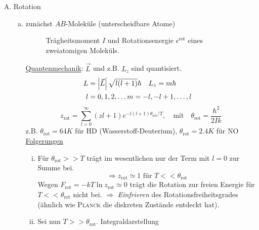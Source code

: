 \begin{enumerate}[A)]
    \item Rotation
    \begin{enumerate}[a)]
        \item zunächst $AB$-Moleküle (unterscheidbare Atome)
        
        \begin{figure}[H]
            \centering
            \def\svgwidth{0.7\textwidth}
            
            \caption{Trägheitsmoment $I$ und Rotationsenergie $\epsilon^{\text{rot}}$ eines zweiatomigen Moleküls.}
            \label{img:2atomicMoleculeInertia}
        \end{figure}
        
        \underline{Quantenmechanik}: $\vec{L}$ und z.B. $L_z$ sind quantisiert.
        \begin{equation}
            \begin{split}
                L &= \left| \vec{L} \right| \sqrt{l(l+1)} \hbar \quad L_z = m \hbar  \\
                l &= 0, 1, 2, \ldots m = -l, -l+1, \ldots, l &
            \end{split}
        \end{equation}
        \begin{equation}
            z_\text{rot} = \sum_{l=0}^{\infty} (zl + 1) e^{-l(l+1) \theta_\text{rot} / T}, \quad \text{mit} \quad \theta_\text{rot} = \frac{\hbar^2}{2 I k}
        \end{equation}
        z.B. $\theta_\text{rot} = 64K$ für HD (Wasserstoff-Deuterium), $\theta_\text{rot} = 2.4K$ für NO \\
        \underline{Folgerungen}
        \begin{enumerate}[i)]
            \item Für $\theta_\text{rot} >> T$ trägt im wesentlichen nur der Term mit $l=0$ zur Summe bei.
            \begin{equation}
                \Rightarrow z_\text{rot} \simeq 1 \text{ für } T << \theta_\text{rot}
            \end{equation}
            Wegen $F_\text{rot} = - k T \ln z_\text{rot} \simeq 0$ trägt die Rotation zur freien Energie für $T << \theta_\text{rot}$ nicht bei.
            $\Rightarrow$ \emph{Einfrieren} des Rotationsfreiheitsgrades (ähnlich wie \textsc{Planck} die diskreten Zustände entdeckt hat).
            \item Sei nun $T >> \theta_\text{rot}$. Integraldarstellung

\end{enumerate}
\end{enumerate}
\end{enumerate}

